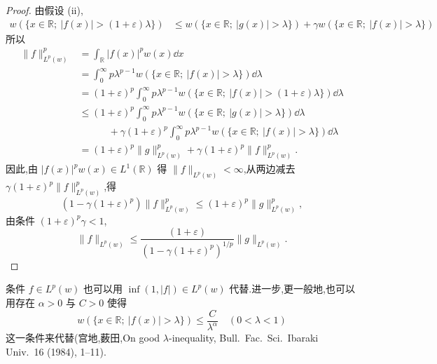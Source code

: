 \begin{proof}
由假设 (ii),
\begin{align*}
w(\{x \in \mathbb{R};\ |f(x)| > (1 + \varepsilon)\lambda\})&\leq w(\{x \in \mathbb{R};\ |g(x)| > \lambda\}) + \gamma w(\{x \in \mathbb{R};\ |f(x)| > \lambda\})
 \end{align*}
所以
\begin{align*}
\| f \|_{L^{p}(w)}^{p} &= \int_{\mathbb{R}}|f(x)|^{p}w(x)\dd x \\
\qquad &= \int_{0}^{\infty}p\lambda^{p-1}w(\{x \in \mathbb{R};\ |f(x)| > \lambda\})\dd \lambda \\
\qquad &= (1 + \varepsilon)^{p}\int_{0}^{\infty}p\lambda^{p-1}w(\{x \in \mathbb{R};\ |f(x)| > (1 + \varepsilon)\lambda\})\dd \lambda \\
\qquad &\leq (1 + \varepsilon)^{p}\int_{0}^{\infty}p\lambda^{p-1}w(\{x \in \mathbb{R};\ |g(x)| > \lambda\})\dd \lambda \\
&\qquad\quad + \gamma(1 + \varepsilon)^{p}\int_{0}^{\infty}p\lambda^{p-1}w(\{x \in \mathbb{R};\ |f(x)| > \lambda\})\dd \lambda \\
\qquad &= (1 + \varepsilon)^{p}\| g \|_{L^{p}(w)}^{p} + \gamma(1 + \varepsilon)^{p}\| f \|_{L^{p}(w)}^{p}.
\end{align*}
因此,由 $|f(x)|^{p}w(x) \in L^{1}(\mathbb{R})$ 得 $\| f \|_{L^{p}(w)} < \infty$,从两边减去 $\gamma(1 + \varepsilon)^{p}\| f \|_{L^{p}(w)}^{p}$,得
\begin{equation*}
\left(1 - \gamma(1 + \varepsilon)^{p}\right)\| f \|_{L^{p}(w)}^{p} \leq (1 + \varepsilon)^{p}\| g \|_{L^{p}(w)}^{p},
\end{equation*}
由条件 $(1 + \varepsilon)^{p}\gamma < 1$,
\begin{equation*}
\| f \|_{L^{p}(w)} \leq \frac{(1 + \varepsilon)}{(1 - \gamma(1 + \varepsilon)^{p})^{1/p}}\| g \|_{L^{p}(w)}.
\end{equation*}
\end{proof}

\begin{note}\label{note:1.6.7}
条件 $f \in L^{p}(w)$ 也可以用 $\inf(1, |f|) \in L^{p}(w)$ 代替.进一步,更一般地,也可以用存在 $\alpha > 0$ 与 $C > 0$ 使得
\begin{equation*}
w(\{x \in \mathbb{R};\ |f(x)| > \lambda\}) \leq \frac{C}{\lambda^{\alpha}} \quad (0 < \lambda < 1)
\end{equation*}
这一条件来代替(宫地,薮田,On good $\lambda$-inequality, Bull.\ Fac.\ Sci.\ Ibaraki Univ.\ 16 (1984), 1--11).
\end{note}


